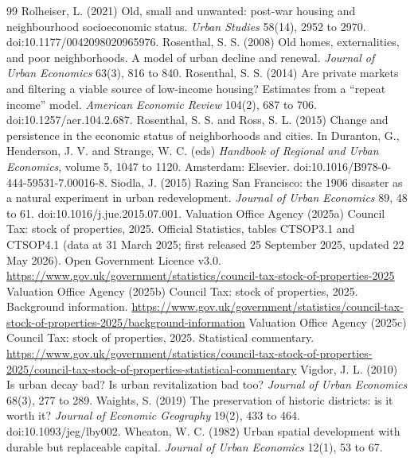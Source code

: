 \documentclass[11pt,a4paper]{article}
\begin{document}
\begin{thebibliography}{99}
 Rolheiser, L. (2021) Old, small and unwanted: post-war housing and neighbourhood socioeconomic status. \textit{Urban Studies} 58(14), 2952 to 2970. doi:10.1177/0042098020965976.
 Rosenthal, S. S. (2008) Old homes, externalities, and poor neighborhoods. A model of urban decline and renewal. \textit{Journal of Urban Economics} 63(3), 816 to 840.
 Rosenthal, S. S. (2014) Are private markets and filtering a viable source of low-income housing? Estimates from a ``repeat income'' model. \textit{American Economic Review} 104(2), 687 to 706. doi:10.1257/aer.104.2.687.
 Rosenthal, S. S. and Ross, S. L. (2015) Change and persistence in the economic status of neighborhoods and cities. In Duranton, G., Henderson, J. V. and Strange, W. C. (eds) \textit{Handbook of Regional and Urban Economics}, volume 5, 1047 to 1120. Amsterdam: Elsevier. doi:10.1016/B978-0-444-59531-7.00016-8.
 Siodla, J. (2015) Razing San Francisco: the 1906 disaster as a natural experiment in urban redevelopment. \textit{Journal of Urban Economics} 89, 48 to 61. doi:10.1016/j.jue.2015.07.001.
 Valuation Office Agency (2025a) Council Tax: stock of properties, 2025. Official Statistics, tables CTSOP3.1 and CTSOP4.1 (data at 31 March 2025; first released 25 September 2025, updated 22 May 2026). Open Government Licence v3.0. \url{https://www.gov.uk/government/statistics/council-tax-stock-of-properties-2025}
 Valuation Office Agency (2025b) Council Tax: stock of properties, 2025. Background information. \url{https://www.gov.uk/government/statistics/council-tax-stock-of-properties-2025/background-information}
 Valuation Office Agency (2025c) Council Tax: stock of properties, 2025. Statistical commentary. \url{https://www.gov.uk/government/statistics/council-tax-stock-of-properties-2025/council-tax-stock-of-properties-statistical-commentary}
 Vigdor, J. L. (2010) Is urban decay bad? Is urban revitalization bad too? \textit{Journal of Urban Economics} 68(3), 277 to 289.
 Waights, S. (2019) The preservation of historic districts: is it worth it? \textit{Journal of Economic Geography} 19(2), 433 to 464. doi:10.1093/jeg/lby002.
 Wheaton, W. C. (1982) Urban spatial development with durable but replaceable capital. \textit{Journal of Urban Economics} 12(1), 53 to 67.

\end{thebibliography}
\end{document}
